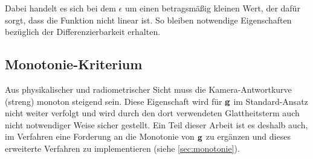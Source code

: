 Dabei handelt es sich bei dem $\epsilon$ um einen betragsmäßig kleinen Wert, der dafür sorgt, dass die Funktion nicht linear ist. So bleiben notwendige Eigenschaften bezüglich der Differenzierbarkeit erhalten.

\subsection{Monotonie-Kriterium}
\label{algo:schwachstellen:monotonie}
Aus physikalischer und radiometrischer Sicht muss die Kamera-Antwortkurve (streng) monoton steigend sein. Diese Eigenschaft wird für $\mathbf g$ im Standard-Ansatz nicht weiter verfolgt und wird durch den dort verwendeten Glattheitsterm auch nicht notwendiger Weise sicher gestellt. Ein Teil dieser Arbeit ist es deshalb auch, im Verfahren eine Forderung an die Monotonie von $\mathbf g$ zu ergänzen und dieses erweiterte Verfahren zu implementieren (siehe \autoref{sec:monotonie}).


